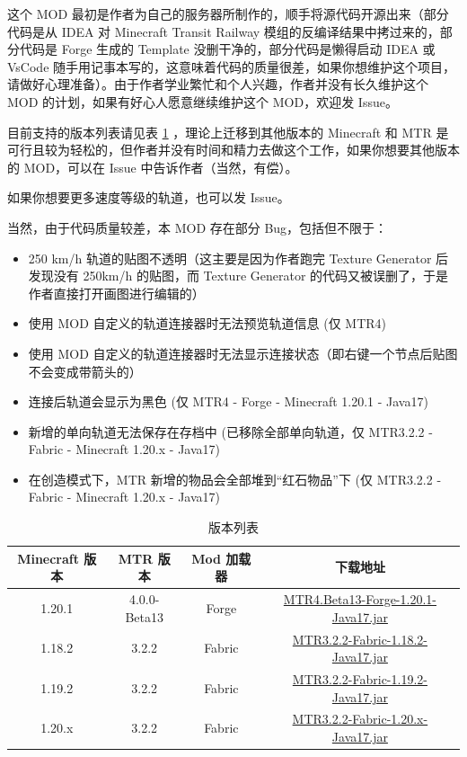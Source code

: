 \documentclass{article}
\begin{document}
这个 MOD 最初是作者为自己的服务器所制作的，顺手将源代码开源出来（部分代码是从 IDEA 对 Minecraft Transit Railway 模组的反编译结果中拷过来的，部分代码是 Forge 生成的 Template 没删干净的，部分代码是懒得启动 IDEA 或 VsCode 随手用记事本写的，这意味着代码的质量很差，如果你想维护这个项目，请做好心理准备）。由于作者学业繁忙和个人兴趣，作者并没有长久维护这个 MOD 的计划，如果有好心人愿意继续维护这个 MOD，欢迎发 Issue。

目前支持的版本列表请见表 \ref{versionTable} ，理论上迁移到其他版本的 Minecraft 和 MTR 是可行且较为轻松的，但作者并没有时间和精力去做这个工作，如果你想要其他版本的 MOD，可以在 Issue 中告诉作者（当然，有偿）。

如果你想要更多速度等级的轨道，也可以发 Issue。

当然，由于代码质量较差，本 MOD 存在部分 Bug，包括但不限于：

\begin{itemize}
    \item 250 km/h 轨道的贴图不透明（这主要是因为作者跑完 Texture Generator 后发现没有 250km/h 的贴图，而 Texture Generator 的代码又被误删了，于是作者直接打开画图进行编辑的）
    \item 使用 MOD 自定义的轨道连接器时无法预览轨道信息 (仅 MTR4)
    \item 使用 MOD 自定义的轨道连接器时无法显示连接状态（即右键一个节点后贴图不会变成带箭头的）
    \item 连接后轨道会显示为黑色 (仅 MTR4 - Forge - Minecraft 1.20.1 - Java17)
    \item 新增的单向轨道无法保存在存档中 (已移除全部单向轨道，仅 MTR3.2.2 - Fabric - Minecraft 1.20.x - Java17)
    \item 在创造模式下，MTR 新增的物品会全部堆到“红石物品”下 (仅 MTR3.2.2 - Fabric - Minecraft 1.20.x - Java17)
\end{itemize}

\begin{table}[!ht]
    \centering
    \label{versionTable}
    \begin{tabular}{c|c|c|c}
        \textbf{Minecraft 版本} & \textbf{MTR 版本} & \textbf{Mod 加载器} & \textbf{下载地址} \\ \hline
        1.20.1 & 4.0.0-Beta13 & Forge & \href{https://github.com/lihugang/mtr-cr-speed-rails/releases/download/MTR4/MTR4.Beta13-Forge-1.20.1-Java17.jar}{MTR4.Beta13-Forge-1.20.1-Java17.jar} \\ 
        1.18.2 & 3.2.2 & Fabric & \href{https://github.com/lihugang/mtr-cr-speed-rails/releases/download/MTR3.2.2/MTR3.2.2-Fabric-1.18.2-Java17.jar}{MTR3.2.2-Fabric-1.18.2-Java17.jar} \\ 
        1.19.2 & 3.2.2 & Fabric & \href{https://github.com/lihugang/mtr-cr-speed-rails/releases/download/MTR3.2.2/MTR3.2.2-Fabric-1.19.2-Java17.jar}{MTR3.2.2-Fabric-1.19.2-Java17.jar} \\ 
        1.20.x & 3.2.2 & Fabric & \href{https://github.com/lihugang/mtr-cr-speed-rails/releases/download/MTR3.2.2/MTR3.2.2-Fabric-1.20.x-Java17.jar}{MTR3.2.2-Fabric-1.20.x-Java17.jar} \\
    \end{tabular}
    \caption{版本列表}
\end{table}
\end{document}
